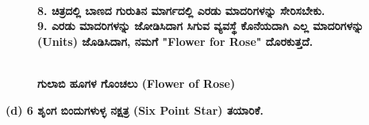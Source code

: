 \begin{figure}[H]
\\
\textbf{8. ಚಿತ್ರದಲ್ಲಿ ಬಾಣದ ಗುರುತಿನ ಮಾರ್ಗದಲ್ಲಿ ಎರಡು ಮಾದರಿಗಳನ್ನು ಸೇರಿಸಬೇಕು.}\\
\textbf{9. ಎರಡು ಮಾದರಿಗಳನ್ನು ಜೋಡಿಸಿದಾಗ ಸಿಗುವ ವ್ಯವಸ್ಥೆ ಕೊನೆಯದಾಗಿ ಎಲ್ಲ ಮಾದರಿಗಳನ್ನು (Units) ಜೊಡಿಸಿದಾಗ, ನಮಗೆ "Flower for Rose" ದೊರಕುತ್ತದೆ.}
\end{figure}
\begin{figure}[H]
\\
\textbf{ಗುಲಾಬಿ ಹೂಗಳ ಗೊಂಚಲು (Flower of Rose)}
\end{figure}

\eject

\noindent
\textbf{(d) 6 ಶೃಂಗ ಬಿಂದುಗಳುಳ್ಳ ನಕ್ಷತ್ರ (Six Point Star) ತಯಾರಿಕೆ.}

